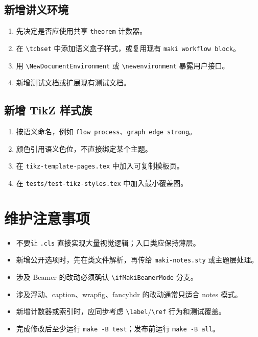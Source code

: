 \documentclass[a4paper,11pt]{ltxdoc}
\newcommand{\mfile}[1]{\texttt{#1}}
\newcommand{\mcmd}[1]{\texttt{\textbackslash#1}}
\newcommand{\mkey}[1]{\texttt{#1}}
\begin{document}
\subsection{新增讲义环境}

\begin{enumerate}
\item 先决定是否应使用共享 \mkey{theorem} 计数器。
\item 在 \mcmd{tcbset} 中添加语义盒子样式，或复用现有 \mkey{maki workflow block}。
\item 用 \mcmd{NewDocumentEnvironment} 或 \mcmd{newenvironment} 暴露用户接口。
\item 新增测试文档或扩展现有测试文档。
\end{enumerate}

\subsection{新增 TikZ 样式族}

\begin{enumerate}
\item 按语义命名，例如 \mkey{flow process}、\mkey{graph edge strong}。
\item 颜色引用语义色位，不直接绑定某个主题。
\item 在 \mfile{tikz-template-pages.tex} 中加入可复制模板页。
\item 在 \mfile{tests/test-tikz-styles.tex} 中加入最小覆盖图。
\end{enumerate}

\section{维护注意事项}

\begin{itemize}
\item 不要让 \mfile{.cls} 直接实现大量视觉逻辑；入口类应保持薄层。
\item 新增公开选项时，先在类文件解析，再传给 \mfile{maki-notes.sty} 或主题层处理。
\item 涉及 Beamer 的改动必须确认 \mcmd{ifMakiBeamerMode} 分支。
\item 涉及浮动、caption、wrapfig、fancyhdr 的改动通常只适合 notes 模式。
\item 新增计数器或索引时，应同步考虑 \mcmd{label}/\mcmd{ref} 行为和测试覆盖。
\item 完成修改后至少运行 \verb|make -B test|；发布前运行 \verb|make -B all|。
\end{itemize}
\end{document}
